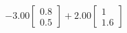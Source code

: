 \documentclass[preview]{standalone}
\begin{document}
\begin{align*}
-3.00 \begin{bmatrix} 0.8 \\ 0.5 \end{bmatrix} + 2.00 \begin{bmatrix} 1 \\ 1.6 \end{bmatrix}
\end{align*}
\end{document}
